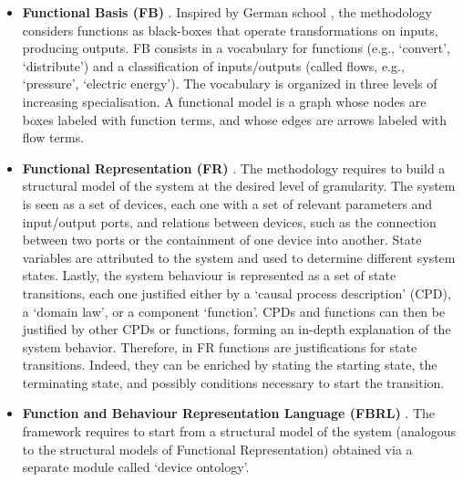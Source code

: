 \documentclass[
]{ceurart}
\begin{document}
\begin{itemize}
    \item \textbf{Functional Basis (FB)} \cite{hirtz_functional_2002}%
    . Inspired by German school \cite{pahl_engineering_2007}, the methodology considers functions as black-boxes that operate transformations on inputs, producing outputs. FB consists in a vocabulary for functions (e.g., `convert', `distribute') and a classification of inputs/outputs (called flows, e.g., `pressure', `electric energy'). The vocabulary is organized in three levels of increasing specialisation. A functional model is a graph whose nodes are boxes labeled with function terms, and whose edges are arrows labeled with %
    flow terms. %
    \item \textbf{Functional Representation (FR)} \cite{chandrasekaranFunctionalRepresentationDesign1993}. The methodology requires to build a structural model of the system at the desired level of granularity. The system is seen as a set of devices, each one with a set of relevant parameters and input/output ports, and relations between devices, such as the connection between two ports or the containment of one device into another. State variables are attributed to the system and used to determine different system states. Lastly, the system behaviour is represented as a set of state transitions, each one justified either by a `causal process description' (CPD), a `domain law', or a component `function'. CPDs and functions can then be justified by other CPDs or functions, forming an in-depth explanation of the system behavior. Therefore, in FR functions are justifications for state transitions. Indeed, they can be enriched by stating the starting state, the terminating state, and possibly conditions necessary to start the transition.
    \item \textbf{Function and Behaviour Representation Language (FBRL)} \cite{sasajimaFBRLFunctionBehavior1995, kitamuraOntologicalModelDevice2006}. The framework requires to start from a structural model of the system
    (analogous to the structural models of Functional Representation) obtained via a separate module called `device ontology'. %

\end{itemize}
\end{document}
